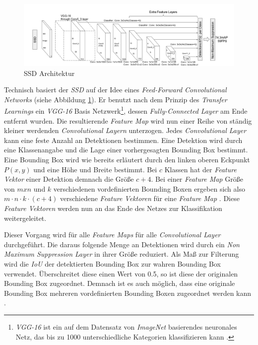 \begin{figure}[H]
	\begin{center}
		\includegraphics[width=15cm]{Bilder/ssd_architecture.png} 
		\caption[SSD Architektur]{SSD Architektur \cite{ssd.20161229}}
		\label{architecture}
	\end{center}
\end{figure}

Technisch basiert der \textit{SSD} auf der Idee eines \textit{Feed-Forward Convolutional Networks} (siehe Abbildung \ref{architecture}). Er benutzt nach dem Prinzip des \textit{Transfer Learnings} ein \textit{VGG-16} Basis Netzwerk\footnote{\textit{VGG-16} ist ein auf dem Datensatz von \textit{ImageNet} basierendes neuronales Netz, das bis zu 1000 unterschiedliche Kategorien klassifizieren kann \cite{KarenSimonyan.2015}.}, dessen \textit{Fully-Connected Layer} am Ende entfernt wurden. Die resultierende \textit{Feature Map} wird nun einer Reihe von ständig kleiner werdenden \textit{Convolutional Layern} unterzogen. Jedes \textit{Convolutional Layer} kann eine feste Anzahl an Detektionen bestimmen. Eine Detektion wird durch eine Klassenangabe und die Lage einer vorhergesagten Bounding Box bestimmt. Eine Bounding Box wird wie bereits erläutert durch den linken oberen Eckpunkt $P(x,y)$ und eine Höhe und Breite bestimmt. Bei $c$ Klassen hat der \textit{Feature Vektor} einer Detektion demnach die Größe $c+4$. Bei einer \textit{Feature Map} Größe von $mxn$ und $k$ verschiedenen vordefinierten Bounding Boxen ergeben sich also $m \cdot n \cdot k \cdot (c+4)$ verschiedene \textit{Feature Vektoren} für eine \textit{Feature Map} \cite{ssd.20161229}. Diese \textit{Feature Vektoren} werden nun an das Ende des Netzes zur Klassifikation weitergeleitet.

Dieser Vorgang wird für alle \textit{Feature Maps} für alle \textit{Convolutional Layer} durchgeführt. Die daraus folgende Menge an Detektionen wird durch ein \textit{Non Maximum Suppression Layer} in ihrer Größe reduziert. Als Maß zur Filterung wird die \textit{IoU} der detektierten Bounding Box zur wahren Bounding Box verwendet. Überschreitet diese einen Wert von 0.5, so ist diese der originalen Bounding Box zugeordnet. Demnach ist es auch möglich, dass eine originale Bounding Box mehreren vordefinierten Bounding Boxen zugeordnet werden kann \cite{ssd.20161229}.

